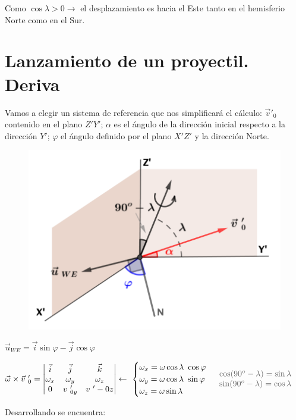 Como $\cos \lambda > 0 \to $ el desplazamiento es hacia el Este tanto en el hemisferio Norte como en el Sur. 

\section{Lanzamiento de un proyectil. Deriva}

Vamos a elegir un sistema de referencia que nos simplificará el cálculo: $\vec v'_0$ contenido en el plano $Z'Y'$; $\alpha$ es el ángulo de la dirección inicial respecto a la dirección $Y'$; $\varphi$ el ángulo definido por el plano $X'Z'$ y la dirección Norte.

\begin{figure}[H]
	\centering
	\includegraphics[width=.7\textwidth]{imagenes/imagenes11/T11IM10.png}
\end{figure}

$\vec u_{WE}=\vec i \sin \varphi -\vec j \cos \varphi$

$\vec \omega \times \vec v\ _0'=
\left|\begin{matrix} 
\vec i&\vec j&\vec k \\ \omega_x&\omega_y&\omega_z \\ 0&v\ '_{0y}&v\ '-{0z}
\end{matrix}\right| \leftarrow \
\begin{cases}
\omega_x=\omega \cos \lambda \ \cos \varphi \\
\omega_y=\omega \cos \lambda \ \sin \varphi \\	
\omega_z=\omega \sin \lambda
\end{cases}
\ \textcolor{gris}{\begin{matrix}\cos (90^o-\lambda)=\sin \lambda \\ \sin (90^o-\lambda)=\cos \lambda \end{matrix}}$

Desarrollando se encuentra:

